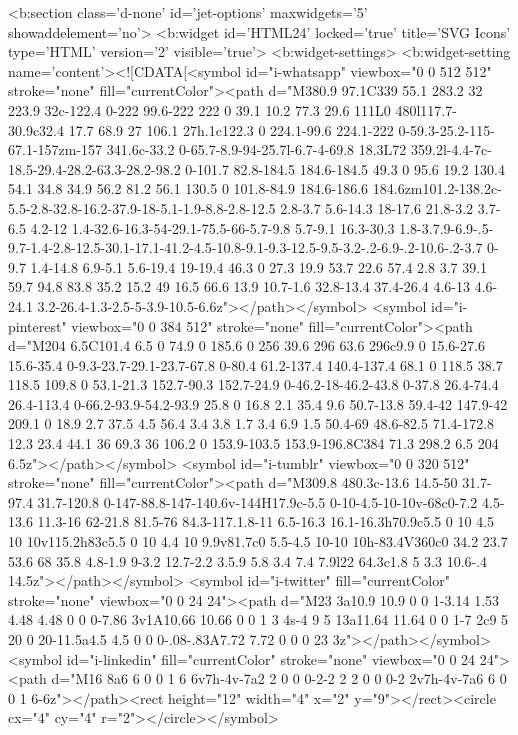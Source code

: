 {{{{<b:section class='d-none' id='jet-options' maxwidgets='5' showaddelement='no'>
  <b:widget id='HTML24' locked='true' title='SVG Icons' type='HTML' version='2' visible='true'>
    <b:widget-settings>
      <b:widget-setting name='content'><![CDATA[<symbol id="i-whatsapp" viewbox="0 0 512 512" stroke="none" fill="currentColor"><path d="M380.9 97.1C339 55.1 283.2 32 223.9 32c-122.4 0-222 99.6-222 222 0 39.1 10.2 77.3 29.6 111L0 480l117.7-30.9c32.4 17.7 68.9 27 106.1 27h.1c122.3 0 224.1-99.6 224.1-222 0-59.3-25.2-115-67.1-157zm-157 341.6c-33.2 0-65.7-8.9-94-25.7l-6.7-4-69.8 18.3L72 359.2l-4.4-7c-18.5-29.4-28.2-63.3-28.2-98.2 0-101.7 82.8-184.5 184.6-184.5 49.3 0 95.6 19.2 130.4 54.1 34.8 34.9 56.2 81.2 56.1 130.5 0 101.8-84.9 184.6-186.6 184.6zm101.2-138.2c-5.5-2.8-32.8-16.2-37.9-18-5.1-1.9-8.8-2.8-12.5 2.8-3.7 5.6-14.3 18-17.6 21.8-3.2 3.7-6.5 4.2-12 1.4-32.6-16.3-54-29.1-75.5-66-5.7-9.8 5.7-9.1 16.3-30.3 1.8-3.7.9-6.9-.5-9.7-1.4-2.8-12.5-30.1-17.1-41.2-4.5-10.8-9.1-9.3-12.5-9.5-3.2-.2-6.9-.2-10.6-.2-3.7 0-9.7 1.4-14.8 6.9-5.1 5.6-19.4 19-19.4 46.3 0 27.3 19.9 53.7 22.6 57.4 2.8 3.7 39.1 59.7 94.8 83.8 35.2 15.2 49 16.5 66.6 13.9 10.7-1.6 32.8-13.4 37.4-26.4 4.6-13 4.6-24.1 3.2-26.4-1.3-2.5-5-3.9-10.5-6.6z"></path></symbol>
<symbol id="i-pinterest" viewbox="0 0 384 512" stroke="none" fill="currentColor"><path d="M204 6.5C101.4 6.5 0 74.9 0 185.6 0 256 39.6 296 63.6 296c9.9 0 15.6-27.6 15.6-35.4 0-9.3-23.7-29.1-23.7-67.8 0-80.4 61.2-137.4 140.4-137.4 68.1 0 118.5 38.7 118.5 109.8 0 53.1-21.3 152.7-90.3 152.7-24.9 0-46.2-18-46.2-43.8 0-37.8 26.4-74.4 26.4-113.4 0-66.2-93.9-54.2-93.9 25.8 0 16.8 2.1 35.4 9.6 50.7-13.8 59.4-42 147.9-42 209.1 0 18.9 2.7 37.5 4.5 56.4 3.4 3.8 1.7 3.4 6.9 1.5 50.4-69 48.6-82.5 71.4-172.8 12.3 23.4 44.1 36 69.3 36 106.2 0 153.9-103.5 153.9-196.8C384 71.3 298.2 6.5 204 6.5z"></path></symbol>
<symbol id="i-tumblr" viewbox="0 0 320 512" stroke="none" fill="currentColor"><path d="M309.8 480.3c-13.6 14.5-50 31.7-97.4 31.7-120.8 0-147-88.8-147-140.6v-144H17.9c-5.5 0-10-4.5-10-10v-68c0-7.2 4.5-13.6 11.3-16 62-21.8 81.5-76 84.3-117.1.8-11 6.5-16.3 16.1-16.3h70.9c5.5 0 10 4.5 10 10v115.2h83c5.5 0 10 4.4 10 9.9v81.7c0 5.5-4.5 10-10 10h-83.4V360c0 34.2 23.7 53.6 68 35.8 4.8-1.9 9-3.2 12.7-2.2 3.5.9 5.8 3.4 7.4 7.9l22 64.3c1.8 5 3.3 10.6-.4 14.5z"></path></symbol>
<symbol id="i-twitter" fill="currentColor" stroke="none" viewbox="0 0 24 24"><path d="M23 3a10.9 10.9 0 0 1-3.14 1.53 4.48 4.48 0 0 0-7.86 3v1A10.66 10.66 0 0 1 3 4s-4 9 5 13a11.64 11.64 0 0 1-7 2c9 5 20 0 20-11.5a4.5 4.5 0 0 0-.08-.83A7.72 7.72 0 0 0 23 3z"></path></symbol>
<symbol id="i-linkedin" fill="currentColor" stroke="none" viewbox="0 0 24 24"><path d="M16 8a6 6 0 0 1 6 6v7h-4v-7a2 2 0 0 0-2-2 2 2 0 0 0-2 2v7h-4v-7a6 6 0 0 1 6-6z"></path><rect height="12" width="4" x="2" y="9"></rect><circle cx="4" cy="4" r="2"></circle></symbol>
}}}}
